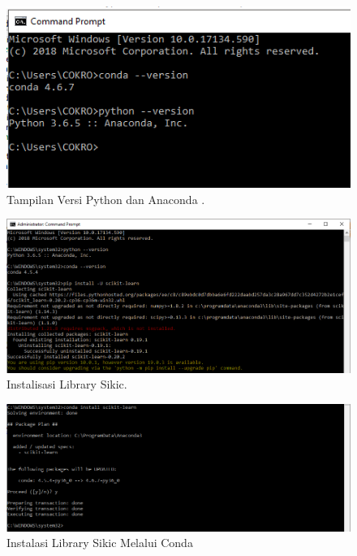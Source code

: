 \begin{enumerate}
\begin{itemize}
\begin{figure}[ht]
      \centerline{\includegraphics[width=1\textwidth]
      {figures/c}}
      \caption{Tampilan Versi Python dan Anaconda .}
      \label{c}
      \end{figure}

\begin{figure}[ht]
      \centerline{\includegraphics[width=1\textwidth]
      {figures/c1}}
      \caption{Instalisasi Library Sikic.}
      \label{c1}
      \end{figure}

\begin{figure}[ht]
      \centerline{\includegraphics[width=1\textwidth]
      {figures/c2}}
      \caption{Instalasi Library Sikic Melalui Conda}
      \label{c2}
      \end{figure}


\end{itemize}
\end{enumerate}
